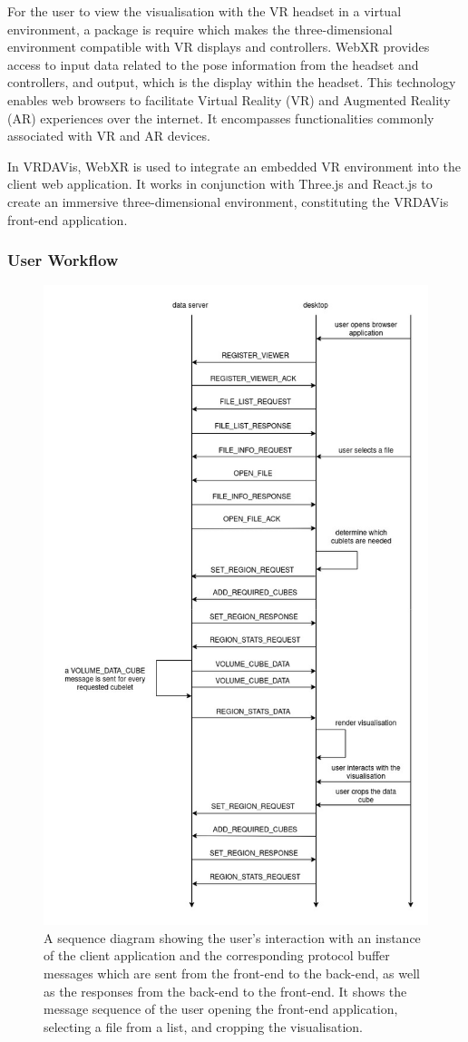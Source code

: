 For the user to view the visualisation with the VR headset in a virtual environment, a package is require which makes the three-dimensional environment compatible with VR displays and controllers.
WebXR provides access to input data related to the pose information from the headset and controllers, and output, which is the display within the headset. 
This technology enables web browsers to facilitate Virtual Reality (VR) and Augmented Reality (AR) experiences over the internet. 
It encompasses functionalities commonly associated with VR and AR devices.

In VRDAVis, WebXR is used to integrate an embedded VR environment into the client web application. It works in conjunction with Three.js and React.js to create an immersive three-dimensional environment, constituting the VRDAVis front-end application.

\subsubsection{User Workflow}

\begin{figure}
    \centering
    \includegraphics[width=0.6\linewidth]{figures/user-worklow(4).jpg}
    \caption{ A sequence diagram showing the user's interaction with an instance of the client application and the corresponding protocol buffer messages which are sent from the front-end to the back-end, as well as the responses from the back-end to the front-end. It shows the message sequence of the user opening the front-end application, selecting a file from a list, and cropping the visualisation.
    }
    \label{fig:user-workflow}
\end{figure}


